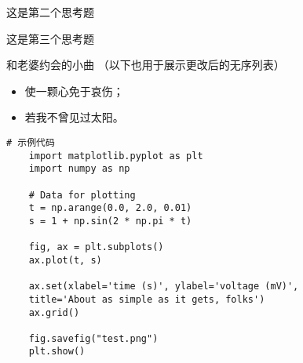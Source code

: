 \begin{question}
	这是第二个思考题
\end{question}

\begin{question}
	这是第三个思考题
\end{question}


\begin{ubox}{和老婆约会的小曲}
	（以下也用于展示更改后的无序列表）
	\begin{itemize}
		\item 使一颗心免于哀伤；
		\item 若我不曾见过太阳。
	\end{itemize}
\end{ubox}

\begin{lstlisting}[style=pythonstyle,caption=代码记录示例]
	# 示例代码
	import matplotlib.pyplot as plt
	import numpy as np
	
	# Data for plotting
	t = np.arange(0.0, 2.0, 0.01)
	s = 1 + np.sin(2 * np.pi * t)
	
	fig, ax = plt.subplots()
	ax.plot(t, s)
	
	ax.set(xlabel='time (s)', ylabel='voltage (mV)',
	title='About as simple as it gets, folks')
	ax.grid()
	
	fig.savefig("test.png")
	plt.show()
\end{lstlisting}

